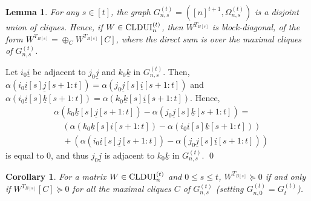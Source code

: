\documentclass[11pt]{article}
\makeatletter
\newcommand{\CLDUI}{\text{\rm CLDUI}}
\newcommand{\ui}{\underline{i}}
\newcommand{\uj}{\underline{j}}
\newcommand{\uk}{\underline{k}}
\theoremstyle{plain}
\newtheorem{lemma}[satz]{Lemma}
\newtheorem{corollary}[satz]{Corollary}
\renewenvironment{proof}[1][\proofname]{%
  \par
  \pushQED{}%
  \normalfont
  \topsep6\p@\@plus6\p@
  \trivlist
  \item[\hskip\labelsep\itshape #1\@addpunct{.}]%
}{%
  \popQED
  \endtrivlist
}
\makeatother
\begin{document}
\begin{lemma}\label{lem:Cliques-s=1..t}
    For any $s\in [t]$, the graph $G_{n,s}^{(t)}=([n]^{t+1}, \Omega^{(t)}_{n,s})$ is a disjoint union of cliques.
Hence, if $W\in\CLDUI^{(t)}_n$, then $W^{T_{B[s]}}$ is block-diagonal, of the form $W^{T_{B[s]}}=\oplus_C W^{T_{B[s]}}[C]$, where the direct sum is over the maximal cliques of $G^{(t)}_{n,s}$. 
\end{lemma}

\begin{proof}
    Let $i_0\ui$ be adjacent to    $j_0\uj$ and $k_0\underline k$ in $G_{n,s}^{(t)}$. Then,   $\alpha(i_0\ui[s]\uj[s+1:t])=\alpha(j_0\uj[s]\ui[s+1:t])$ and 
    $\alpha(i_0\ui[s]\uk[s+1:t])=\alpha(k_0\uk[s]\ui[s+1:t])$. Hence, 
  \begin{align*}
  &  \alpha(k_0\uk[s]\uj[s+1:t])-\alpha(j_0\uj[s]\uk[s+1:t]) =
   \\
   & \quad (\alpha(k_0\uk[s]\ui[s+1:t])-\alpha(i_0\ui[s]\uk[s+1:t])) \\
  &  \quad   + (\alpha(i_0\ui[s]\uj[s+1:t])-\alpha(j_0\uj[s]\ui[s+1:t]))
    \end{align*}
  is equal to 0, and thus   $j_0\uj$ is adjacent to $k_0\underline k$ in $G^{(t)}_{n,s}$.
\qed \end{proof}


\begin{corollary}\label{cor:BlockDiagCert}
    For a matrix $W\in \CLDUI^{(t)}_n$ and $0\le s\le t$, $W^{T_{B[s]}}\succeq 0$ if and only if $W^{T_{B[s]}}[C]\succeq 0$ for all the maximal cliques $C$ of $G^{(t)}_{n,s}$ (setting $G^{(t)}_{n,0}=G^{(t)}_t$).
\end{corollary}

\end{document}
